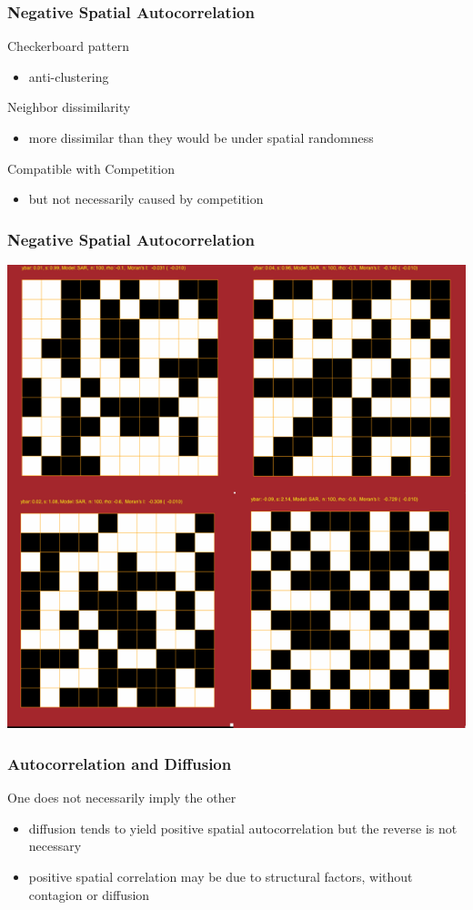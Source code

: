 \documentclass[nototal]{beamer}
\begin{document}
\begin{frame}
  \frametitle{Negative Spatial Autocorrelation}
  \begin{block}{Checkerboard pattern}
    \begin{itemize}
      \item anti-clustering
    \end{itemize}
  \end{block}
  \begin{block}{Neighbor dissimilarity}
    \begin{itemize}
      \item more dissimilar than they would be under spatial randomness
    \end{itemize}
  \end{block}
\begin{block}{Compatible with Competition}
    \begin{itemize}
      \item but not necessarily caused by competition
    \end{itemize}
  \end{block}
\end{frame}

  \begin{frame}
    \frametitle{Negative Spatial Autocorrelation}
    \begin{center}
      \includegraphics[width=.65\linewidth]{negative.png}
    \end{center}
  \end{frame}

\begin{frame}
  \frametitle{Autocorrelation and Diffusion}
  \begin{block}{One does not necessarily imply the other}
    \begin{itemize}
      \item diffusion tends to yield positive spatial autocorrelation but the
	reverse is not necessary
      \item positive spatial correlation may be due to structural factors,
	without contagion or diffusion
    \end{itemize}
  \end{block}
\end{frame}
\end{document}
